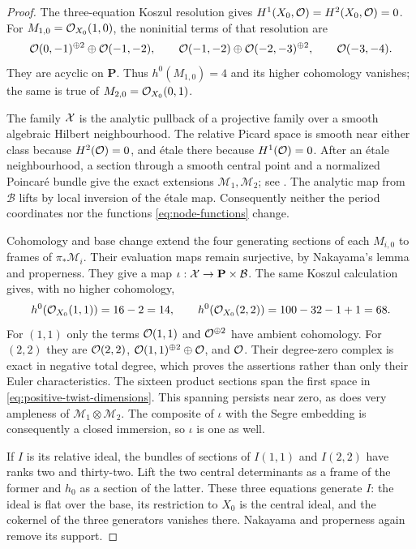 \begin{proof}
The three-equation Koszul resolution gives
$H^1(X_0,\mathcal O)=H^2(X_0,\mathcal O)=0$. For
$M_{1,0}=\mathcal O_{X_0}(1,0)$, the noninitial terms of that resolution
are
\[
 \mathcal O(0,-1)^{\oplus2}\oplus\mathcal O(-1,-2),\qquad
 \mathcal O(-1,-2)\oplus\mathcal O(-2,-3)^{\oplus2},\qquad
 \mathcal O(-3,-4).
\]
They are acyclic on $\mathbf P$. Thus $h^0(M_{1,0})=4$ and
its higher cohomology vanishes; the same is true of
$M_{2,0}=\mathcal O_{X_0}(0,1)$.

The family $\mathcal X$ is the analytic pullback of a projective family
over a smooth algebraic Hilbert neighbourhood. The relative
Picard space is smooth near either class because $H^2(\mathcal O)=0$,
and étale there because $H^1(\mathcal O)=0$. After an étale
neighbourhood, a section through a smooth central point and a
normalized Poincaré bundle give the exact extensions
$\mathcal M_1,\mathcal M_2$; see
\cite[Theorems 2.5(2), 4.8 and Proposition 5.19]{Kleiman}.
The analytic map from $\mathcal B$ lifts by local inversion of
the étale map. Consequently neither the period coordinates nor
the functions \eqref{eq:node-functions} change.

Cohomology and base change extend the four generating sections
of each $M_{i,0}$ to frames of $\pi_*\mathcal M_i$.
Their evaluation maps remain surjective, by Nakayama's lemma
and properness. They give a map $\iota:\mathcal X\to\mathbf P\times\mathcal B$.
The same Koszul calculation gives, with no higher cohomology,
\begin{equation}\label{eq:positive-twist-dimensions}
 h^0(\mathcal O_{X_0}(1,1))=16-2=14,\qquad
 h^0(\mathcal O_{X_0}(2,2))=100-32-1+1=68.
\end{equation}
For $(1,1)$ only the terms $\mathcal O(1,1)$ and $\mathcal O^{\oplus2}$
have ambient cohomology. For $(2,2)$ they are
$\mathcal O(2,2)$, $\mathcal O(1,1)^{\oplus2}\oplus\mathcal O$, and $\mathcal O$.
Their degree-zero complex is exact in negative total degree,
which proves the assertions rather than only their Euler characteristics.
The sixteen product sections span the first space in
\eqref{eq:positive-twist-dimensions}. This spanning persists
near zero, as does very ampleness of $\mathcal M_1\otimes\mathcal M_2$.
The composite of $\iota$ with the Segre embedding is consequently
a closed immersion, so $\iota$ is one as well.

If $I$ is its relative ideal, the bundles of sections of
$I(1,1)$ and $I(2,2)$ have ranks two and thirty-two. Lift the
two central determinants as a frame of the former and $h_0$
as a section of the latter. These three equations generate $I$:
the ideal is flat over the base, its restriction to $X_0$ is
the central ideal, and the cokernel of the three generators
vanishes there. Nakayama and properness again remove its support.


\end{proof}
